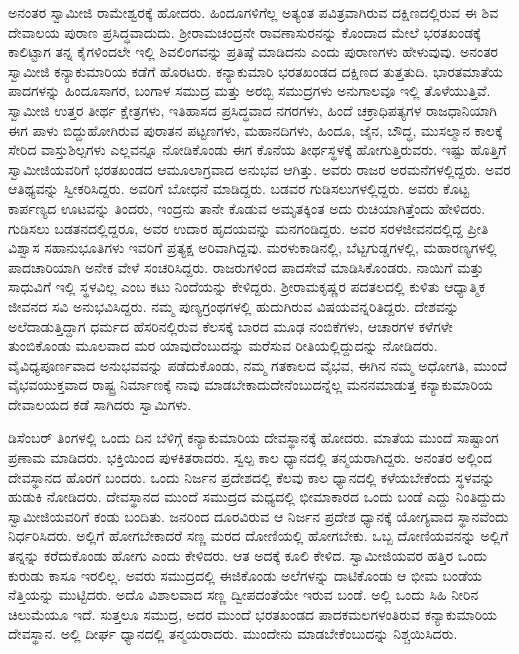  ಅನಂತರ ಸ್ವಾಮೀಜಿ ರಾಮೇಶ್ವರಕ್ಕೆ ಹೋದರು. ಹಿಂದೂಗಳಿಗೆಲ್ಲ ಅತ್ಯಂತ ಪವಿತ್ರವಾಗಿರುವ ದಕ್ಷಿಣದಲ್ಲಿರುವ ಈ ಶಿವ ದೇವಾಲಯ ಪುರಾಣ ಪ್ರಸಿದ್ಧವಾದುದು. ಶ‍್ರೀರಾಮಚಂದ್ರನೇ ರಾವಣಾಸುರನನ್ನು ಕೊಂದಾದ ಮೇಲೆ ಭರತಖಂಡಕ್ಕೆ ಕಾಲಿಟ್ಟಾಗ ತನ್ನ ಕೈಗಳಿಂದಲೇ ಇಲ್ಲಿ ಶಿವಲಿಂಗವನ್ನು ಪ್ರತಿಷ್ಠೆ ಮಾಡಿದನು ಎಂದು ಪುರಾಣಗಳು ಹೇಳುವುವು. ಅನಂತರ ಸ್ವಾಮೀಜಿ ಕನ್ಯಾಕುಮಾರಿಯ ಕಡೆಗೆ ಹೊರಟರು. ಕನ್ಯಾಕುಮಾರಿ ಭರತಖಂಡದ ದಕ್ಷಿಣದ ತುತ್ತತುದಿ. ಭಾರತಮಾತೆಯ ಪಾದಗಳನ್ನು ಹಿಂದೂಸಾಗರ, ಬಂಗಾಳ ಸಮುದ್ರ ಮತ್ತು ಅರಬ್ಬಿ ಸಮುದ್ರಗಳು ಅನುಗಾಲವೂ ಇಲ್ಲಿ ತೊಳೆಯುತ್ತಿವೆ. ಸ್ವಾಮೀಜಿ ಉತ್ತರ ತೀರ್ಥ ಕ್ಷೇತ್ರಗಳು, ಇತಿಹಾಸದ ಪ್ರಸಿದ್ಧವಾದ ನಗರಗಳು, ಹಿಂದೆ ಚಕ್ರಾಧಿಪತ್ಯಗಳ ರಾಜಧಾನಿಯಾಗಿ ಈಗ ಪಾಳು ಬಿದ್ದುಹೋಗಿರುವ ಪುರಾತನ ಪಟ್ಟಣಗಳು, ಮಹಾನದಿಗಳು, ಹಿಂದೂ, ಜೈನ, ಬೌದ್ಧ, ಮುಸಲ್ಮಾನ ಕಾಲಕ್ಕೆ ಸೇರಿದ ವಾಸ್ತುಶಿಲ್ಪಗಳು ಎಲ್ಲವನ್ನೂ ನೋಡಿಕೊಂಡು ಈಗ ಕೊನೆಯ ತೀರ್ಥಸ್ಥಳಕ್ಕೆ ಹೋಗುತ್ತಿರುವರು. ಇಷ್ಟು ಹೊತ್ತಿಗೆ ಸ್ವಾಮೀಜಿಯವರಿಗೆ ಭರತಖಂಡದ ಆಮೂಲಾಗ್ರವಾದ ಅನುಭವ ಆಗಿತ್ತು. ಅವರು ರಾಜರ ಅರಮನೆಗಳಲ್ಲಿದ್ದರು. ಅವರ ಆತಿಥ್ಯವನ್ನು ಸ್ವೀಕರಿಸಿದ್ದರು. ಅವರಿಗೆ ಬೋಧನೆ ಮಾಡಿದ್ದರು. ಬಡವರ ಗುಡಿಸಲುಗಳಲ್ಲಿದ್ದರು. ಅವರು ಕೊಟ್ಟ ಕಾರ್ಪಣ್ಯದ ಊಟವನ್ನು ತಿಂದರು, ಇಂದ್ರನು ತಾನೇ ಕೊಡುವ ಅಮೃತಕ್ಕಿಂತ ಅದು ರುಚಿಯಾಗಿತ್ತೆಂದು ಹೇಳಿದರು. ಗುಡಿಸಲು ಬಡತನದಲ್ಲಿದ್ದರೂ, ಅವರ ಉದಾರ ಹೃದಯವನ್ನು ಮನಗಂಡಿದ್ದರು. ಅವರ ಸರಳಜೀವನದಲ್ಲಿದ್ದ ಪ್ರೀತಿ ವಿಶ್ವಾಸ ಸಹಾನುಭೂತಿಗಳು ಇವರಿಗೆ ಪ್ರತ್ಯಕ್ಷ ಅರಿವಾಗಿದ್ದವು. ಮರಳುಕಾಡಿನಲ್ಲಿ, ಬೆಟ್ಟಗುಡ್ಡಗಳಲ್ಲಿ, ಮಹಾರಣ್ಯಗಳಲ್ಲಿ ಪಾದಚಾರಿಯಾಗಿ ಅನೇಕ ವೇಳೆ ಸಂಚರಿಸಿದ್ದರು. ರಾಜರುಗಳಿಂದ ಪಾದಸೇವೆ ಮಾಡಿಸಿಕೊಂಡರು. ನಾಯಿಗೆ ಮತ್ತು ಸಾಧುವಿಗೆ ಇಲ್ಲಿ ಸ್ಥಳವಿಲ್ಲ ಎಂಬ ಕಟು ನಿಂದೆಯನ್ನು ಕೇಳಿದ್ದರು. ಶ‍್ರೀರಾಮಕೃಷ್ಣರ ಪದತಲದಲ್ಲಿ ಕುಳಿತು ಆಧ್ಯಾತ್ಮಿಕ ಜೀವನದ ಸವಿ ಅನುಭವಿಸಿದ್ದರು. ನಮ್ಮ ಪುಣ್ಯಗ್ರಂಥಗಳಲ್ಲಿ ಹುದುಗಿರುವ ವಿಷಯವನ್ನರಿತಿದ್ದರು. ದೇಶವನ್ನು ಅಲೆದಾಡುತ್ತಿದ್ದಾಗ ಧರ್ಮದ ಹೆಸರಿನಲ್ಲಿರುವ ಕೆಲಸಕ್ಕೆ ಬಾರದ ಮೂಢ ನಂಬಿಕೆಗಳು, ಆಚಾರಗಳ ಕಳೆಗಳೇ ತುಂಬಿಕೊಂಡು ಮೂಲವಾದ ಮರ ಯಾವುದೆಂಬುದನ್ನು ಮರೆಸುವ ರೀತಿಯಲ್ಲಿದ್ದುದನ್ನು ನೋಡಿದರು. ವೈವಿಧ್ಯಪೂರ್ಣವಾದ ಅನುಭವವನ್ನು ಪಡೆದುಕೊಂಡು, ನಮ್ಮ ಗತಕಾಲದ ವೈಭವ, ಈಗಿನ ನಮ್ಮ ಅಧೋಗತಿ, ಮುಂದೆ ವೈಭವಯುಕ್ತವಾದ ರಾಷ್ಟ್ರ ನಿರ್ಮಾಣಕ್ಕೆ ನಾವು ಮಾಡಬೇಕಾದುದೇನೆಂಬುದನ್ನೆಲ್ಲ ಮನನಮಾಡುತ್ತ ಕನ್ಯಾಕುಮಾರಿಯ ದೇವಾಲಯದ ಕಡೆ ಸಾಗಿದರು ಸ್ವಾಮಿಗಳು. 

\newpage

 ಡಿಸೆಂಬರ್ ತಿಂಗಳಲ್ಲಿ ಒಂದು ದಿನ ಬೆಳಿಗ್ಗೆ ಕನ್ಯಾಕುಮಾರಿಯ ದೇವಸ್ಥಾನಕ್ಕೆ ಹೋದರು. ಮಾತೆಯ ಮುಂದೆ ಸಾಷ್ಟಾಂಗ ಪ್ರಣಾಮ ಮಾಡಿದರು. ಭಕ್ತಿಯಿಂದ ಪುಳಕಿತರಾದರು. ಸ್ವಲ್ಪ ಕಾಲ ಧ್ಯಾನದಲ್ಲಿ ತನ್ಮಯರಾಗಿದ್ದರು. ಅನಂತರ ಅಲ್ಲಿಂದ ದೇವಸ್ಥಾನದ ಹೊರಗೆ ಬಂದರು. ಒಂದು ನಿರ್ಜನ ಪ್ರದೇಶದಲ್ಲಿ ಕೆಲವು ಕಾಲ ಧ್ಯಾನದಲ್ಲಿ ಕಳೆಯಬೇಕೆಂದು ಸ್ಥಳವನ್ನು ಹುಡುಕಿ ನೋಡಿದರು. ದೇವಸ್ಥಾನದ ಮುಂದೆ ಸಮುದ್ರದ ಮಧ್ಯದಲ್ಲಿ ಭೀಮಾಕಾರದ ಒಂದು ಬಂಡೆ ಎದ್ದು ನಿಂತಿದ್ದುದು ಸ್ವಾಮೀಜಿಯವರಿಗೆ ಕಂಡು ಬಂದಿತು. ಜನರಿಂದ ದೂರವಿರುವ ಆ ನಿರ್ಜನ ಪ್ರದೇಶ ಧ್ಯಾನಕ್ಕೆ ಯೋಗ್ಯವಾದ ಸ್ಥಾನವೆಂದು ನಿರ್ಧರಿಸಿದರು. ಅಲ್ಲಿಗೆ ಹೋಗಬೇಕಾದರೆ ಸಣ್ಣ ಮರದ ದೋಣಿಯಲ್ಲಿ ಹೋಗಬೇಕು. ಒಬ್ಬ ದೋಣಿಯವನನ್ನು ಅಲ್ಲಿಗೆ ತನ್ನನ್ನು ಕರೆದುಕೊಂಡು ಹೋಗು ಎಂದು ಕೇಳಿದರು. ಆತ ಅದಕ್ಕೆ ಕೂಲಿ ಕೇಳಿದ. ಸ್ವಾಮೀಜಿಯವರ ಹತ್ತಿರ ಒಂದು ಕುರುಡು ಕಾಸೂ ಇರಲಿಲ್ಲ. ಅವರು ಸಮುದ್ರದಲ್ಲಿ ಈಜಿಕೊಂಡು ಅಲೆಗಳನ್ನು ದಾಟಿಕೊಂಡು ಆ ಭೀಮ ಬಂಡೆಯ ನೆತ್ತಿಯನ್ನು ಮುಟ್ಟಿದರು. ಅದೊ ವಿಶಾಲವಾದ ಸಣ್ಣ ದ್ವೀಪದಂತೆಯೇ ಇರುವ ಬಂಡೆ. ಅಲ್ಲಿ ಒಂದು ಸಿಹಿ ನೀರಿನ ಚಿಲುಮೆಯೂ ಇದೆ. ಸುತ್ತಲೂ ಸಮುದ್ರ, ಅದರ ಮುಂದೆ ಭರತಖಂಡದ ಪಾದಕಮಲಗಳಂತಿರುವ ಕನ್ಯಾಕುಮಾರಿಯ ದೇವಸ್ಥಾನ. ಅಲ್ಲಿ ದೀರ್ಘ ಧ್ಯಾನದಲ್ಲಿ ತನ್ಮಯರಾದರು. ಮುಂದೇನು ಮಾಡಬೇಕೆಂಬುದನ್ನು ನಿಶ್ಚಯಿಸಿದರು. 

